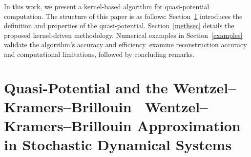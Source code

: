 \documentclass[11pt]{article}
\theoremstyle{plain}      %
\theoremstyle{definition} %
\providecommand{\DIFaddtex}[1]{{\protect\color{blue}#1}} %
\providecommand{\DIFdeltex}[1]{{\protect\color{red}#1}} %
\providecommand{\DIFaddbegin}{} %
\providecommand{\DIFaddend}{} %
\providecommand{\DIFdelbegin}{} %
\providecommand{\DIFdelend}{} %
\providecommand{\DIFadd}[1]{\texorpdfstring{\DIFaddtex{#1}}{#1}} %
\providecommand{\DIFdel}[1]{\texorpdfstring{\DIFdeltex{#1}}{}} %
\newcommand{\DIFscaledelfig}{1.0}
\newlength{\DIFdelgraphicswidth} %
\newlength{\DIFdelgraphicsheight} %
\newcommand{\DIFaddincludegraphics}[2][]{{\color{blue}\fbox{\DIFOincludegraphics[#1]{#2}}}} %
\newcommand{\DIFdelincludegraphics}[2][]{%
\sbox{\DIFdelgraphicsbox}{\DIFOincludegraphics[#1]{#2}}%
\settoboxwidth{\DIFdelgraphicswidth}{\DIFdelgraphicsbox} %
\settoboxtotalheight{\DIFdelgraphicsheight}{\DIFdelgraphicsbox} %
\scalebox{\DIFscaledelfig}{%
\parbox[b]{\DIFdelgraphicswidth}{\usebox{\DIFdelgraphicsbox}\\[-\baselineskip] \rule{\DIFdelgraphicswidth}{0em}}\llap{\resizebox{\DIFdelgraphicswidth}{\DIFdelgraphicsheight}{%
\setlength{\unitlength}{\DIFdelgraphicswidth}%
\begin{picture}(1,1)%
\thicklines\linethickness{2pt} %
{\color[rgb]{1,0,0}\put(0,0){\framebox(1,1){}}}%
{\color[rgb]{1,0,0}\put(0,0){\line( 1,1){1}}}%
{\color[rgb]{1,0,0}\put(0,1){\line(1,-1){1}}}%
\end{picture}%
}\hspace*{3pt}}} %
} %
\DeclareRobustCommand{\DIFaddbegin}{\DIFOaddbegin \let\includegraphics\DIFaddincludegraphics} %
\DeclareRobustCommand{\DIFaddend}{\DIFOaddend \let\includegraphics\DIFOincludegraphics} %
\DeclareRobustCommand{\DIFdelbegin}{\DIFOdelbegin \let\includegraphics\DIFdelincludegraphics} %
\DeclareRobustCommand{\DIFdelend}{\DIFOaddend \let\includegraphics\DIFOincludegraphics} %
\begin{document}
\DIFaddend In this work, we present a kernel-based algorithm for quasi-potential computation. The structure of this paper is as follows: Section~\ref{qpsec} introduces the definition and properties of the quasi-potential. Section~\ref{methsec} details the proposed kernel-driven methodology. Numerical examples in Section~\ref{examples} \DIFdelbegin \DIFdel{validate the algorithm's accuracy and efficiency}\DIFdelend\ \DIFaddbegin \DIFadd{examine reconstruction accuracy and computational limitations}\DIFaddend , followed by concluding remarks.







 


 

\setcounter{equation}{0}
\section{Quasi-Potential and the \DIFdelbegin \DIFdel{Wentzel–Kramers–Brillouin }\DIFdelend\ \DIFaddbegin \DIFadd{Wentzel--Kramers--Brillouin }\DIFaddend Approximation in Stochastic Dynamical Systems} \label{qpsec}
\end{document}
